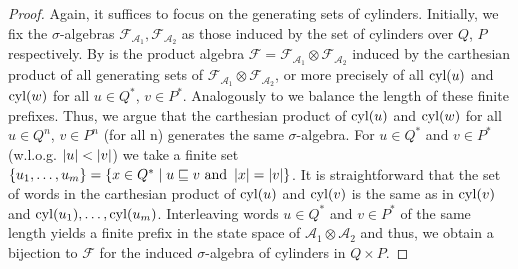 \begin{proof}
  Again, it suffices to focus on the generating sets of cylinders. Initially,
  we fix the $\sigma$-algebras $\mathcal{F}_{\mathcal{A}_{1}},
  \mathcal{F}_{\mathcal{A}_{2}}$ as those induced by the set of cylinders over
  $Q$, $P$ respectively. By \cite[Theorem 22.1]{Bauer} is the product algebra
  $\mathcal{F} = \mathcal{F}_{\mathcal{A}_{1}}\otimes
  \mathcal{F}_{\mathcal{A}_{2}}$ induced by the carthesian product of all
  generating sets of $\mathcal{F}_{\mathcal{A}_{1}}\otimes
  \mathcal{F}_{\mathcal{A}_{2}}$, or more precisely of all $\operatorname{cyl}(u)$ and
  $\operatorname{cyl}(w)$ for all $u\in Q^{*}$, $v\in P^{*}$. Analogously to
  \cite[Remark 35]{RandAutoInfTrees} we balance the length of these finite
  prefixes. Thus, we argue that the carthesian product of $\operatorname{cyl}(u)$ and
  $\operatorname{cyl}(w)$ for all $u\in Q^{n}$, $v\in P^{n}$ (for all n) generates the same
  $\sigma$-algebra.  For $u\in Q^{*}$ and $v\in P^{*}$ (w.l.o.g.
  $\left\vert{u}\right\vert < \left\vert{v}\right\vert$) we take a finite set
  $\left\{u_{1},\dots,u_{m}\right\} = \left\{x\in Q^{*}\mid u\sqsubseteq v \text{ and }
  \left\vert{x}\right\vert = \left\vert{v}\right\vert\right\}$. It is straightforward that the set of words in the
  carthesian product of $\operatorname{cyl}(u)$ and $\operatorname{cyl}(v)$ is the same as in $\operatorname{cyl}(v)$ and
  $\operatorname{cyl}(u_{1}),\dots,\operatorname{cyl}(u_{m})$. Interleaving words $u\in Q^{*}$ and
  $v\in P^{*}$ of the same length yields a finite prefix in the state space of
  $\mathcal{A}_{1}\otimes\mathcal{A}_{2}$ and thus, we obtain a bijection to
  $\mathcal{F}$ for the induced $\sigma$-algebra of cylinders in $Q\times P$.


\end{proof}
